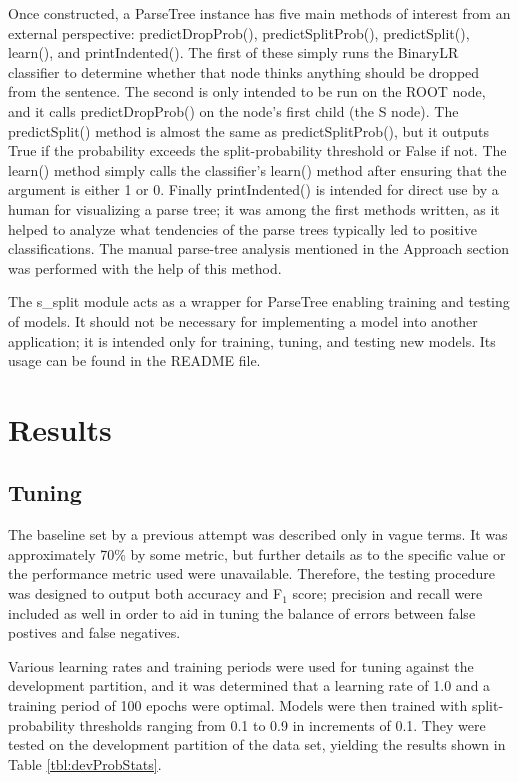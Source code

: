 \documentclass{article}
\begin{document}
Once constructed, a ParseTree instance has five main methods of interest from an external perspective: predictDropProb(), predictSplitProb(), predictSplit(), learn(), and printIndented(). The first of these simply runs the BinaryLR classifier to determine whether that node thinks anything should be dropped from the sentence. The second is only intended to be run on the ROOT node, and it calls predictDropProb() on the node's first child (the S node). The predictSplit() method is almost the same as predictSplitProb(), but it outputs True if the probability exceeds the split-probability threshold or False if not. The learn() method simply calls the classifier's learn() method after ensuring that the argument is either 1 or 0. Finally printIndented() is intended for direct use by a human for visualizing a parse tree; it was among the first methods written, as it helped to analyze what tendencies of the parse trees typically led to positive classifications. The manual parse-tree analysis mentioned in the Approach section was performed with the help of this method.

The s\_split module acts as a wrapper for ParseTree enabling training and testing of models. It should not be necessary for implementing a model into another application; it is intended only for training, tuning, and testing new models. Its usage can be found in the README file.

\clearpage



\section*{Results}

\subsection*{Tuning}

The baseline set by a previous attempt was described only in vague terms. It was approximately 70\% by some metric, but further details as to the specific value or the performance metric used were unavailable. Therefore, the testing procedure was designed to output both accuracy and F$_1$ score; precision and recall were included as well in order to aid in tuning the balance of errors between false postives and false negatives.

Various learning rates and training periods were used for tuning against the development partition, and it was determined that a learning rate of 1.0 and a training period of 100 epochs were optimal. Models were then trained with split-probability thresholds ranging from 0.1 to 0.9 in increments of 0.1. They were tested on the development partition of the data set, yielding the results shown in Table \ref{tbl:devProbStats}.
\end{document}
